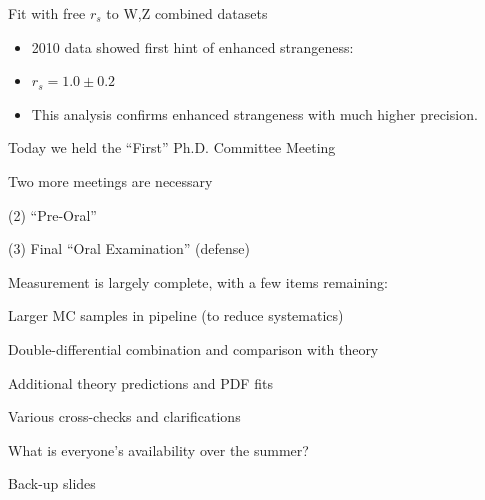 \begin{frame}{Fit with free $r_s$ to W,Z combined datasets}
\begin{itemize}
\item 2010 data showed first hint of enhanced strangeness:
\iteb
\item $r_s = 1.0 \pm 0.2$
\itee
\item This analysis confirms enhanced strangeness with much higher precision.
\end{itemize}


\end{frame}



{
\iteb
\item Today we held the ``First'' Ph.D. Committee Meeting
\item Two more meetings are necessary
\iteb
\item (2) ``Pre-Oral''
\item (3) Final ``Oral Examination'' (defense)
\itee
\item Measurement is largely complete, with a few items remaining:
\iteb
\item Larger MC samples in pipeline (to reduce systematics)
\item Double-differential combination and comparison with theory
\item Additional theory predictions and PDF fits
\item Various cross-checks and clarifications
\itee
\item What is everyone's availability over the summer?
\itee
}

\appendix
{}
\setcounter{finalframe}{\value{framenumber}}

\slide{}
{
\centering
\Huge Back-up slides
}

